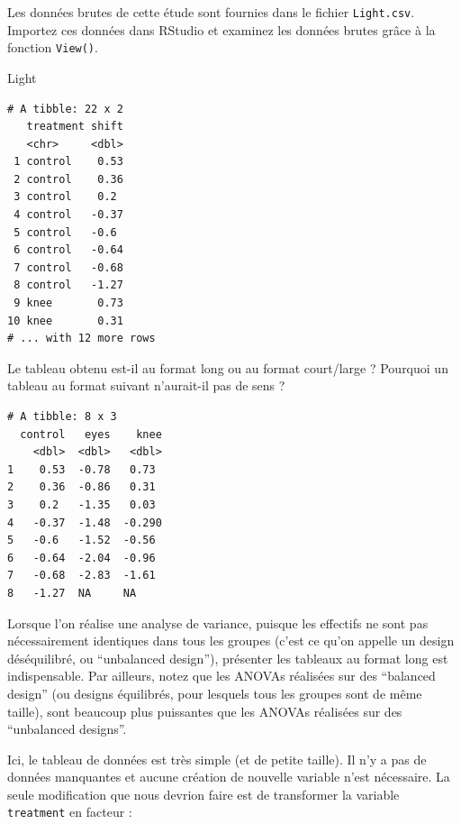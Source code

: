 \documentclass[a4paperpaper,]{article}
\newenvironment{Shaded}{\begin{snugshade}}{\end{snugshade}}
\newcommand{\DataTypeTok}[1]{\textcolor[rgb]{0.00,0.34,0.68}{#1}}
\newcommand{\KeywordTok}[1]{\textcolor[rgb]{0.12,0.11,0.11}{\textbf{#1}}}
\newcommand{\NormalTok}[1]{\textcolor[rgb]{0.12,0.11,0.11}{#1}}
\newcommand{\OperatorTok}[1]{\textcolor[rgb]{0.12,0.11,0.11}{#1}}
\newcommand{\StringTok}[1]{\textcolor[rgb]{0.75,0.01,0.01}{#1}}
\begin{document}
Les données brutes de cette étude sont fournies dans le fichier \texttt{Light.csv}. Importez ces données dans RStudio et examinez les données brutes grâce à la fonction \texttt{View()}.

\begin{Shaded}
\begin{Highlighting}[]
\NormalTok{Light}
\end{Highlighting}
\end{Shaded}

\begin{verbatim}
# A tibble: 22 x 2
   treatment shift
   <chr>     <dbl>
 1 control    0.53
 2 control    0.36
 3 control    0.2 
 4 control   -0.37
 5 control   -0.6 
 6 control   -0.64
 7 control   -0.68
 8 control   -1.27
 9 knee       0.73
10 knee       0.31
# ... with 12 more rows
\end{verbatim}

Le tableau obtenu est-il au format long ou au format court/large ? Pourquoi un tableau au format suivant n'aurait-il pas de sens ?

\begin{verbatim}
# A tibble: 8 x 3
  control   eyes    knee
    <dbl>  <dbl>   <dbl>
1    0.53  -0.78   0.73 
2    0.36  -0.86   0.31 
3    0.2   -1.35   0.03 
4   -0.37  -1.48  -0.290
5   -0.6   -1.52  -0.56 
6   -0.64  -2.04  -0.96 
7   -0.68  -2.83  -1.61 
8   -1.27  NA     NA    
\end{verbatim}

Lorsque l'on réalise une analyse de variance, puisque les effectifs ne sont pas nécessairement identiques dans tous les groupes (c'est ce qu'on appelle un design déséquilibré, ou ``unbalanced design''), présenter les tableaux au format long est indispensable. Par ailleurs, notez que les ANOVAs réalisées sur des ``balanced design'' (ou designs équilibrés, pour lesquels tous les groupes sont de même taille), sont beaucoup plus puissantes que les ANOVAs réalisées sur des ``unbalanced designs''.

Ici, le tableau de données est très simple (et de petite taille). Il n'y a pas de données manquantes et aucune création de nouvelle variable n'est nécessaire. La seule modification que nous devrion faire est de transformer la variable \texttt{treatment} en facteur :

\begin{Shaded}
\end{Shaded}
\end{document}
